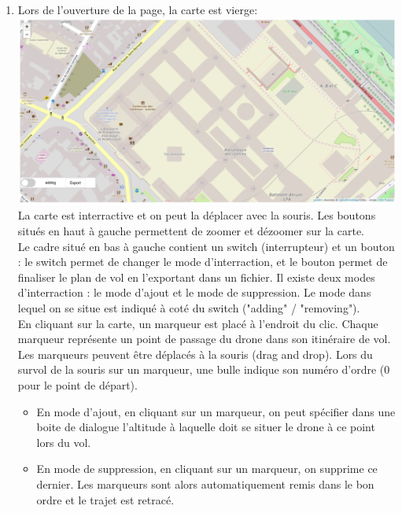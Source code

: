\documentclass{article}
\begin{document}
 \begin{enumerate}
 \item Lors de l'ouverture de la page, la carte est vierge:\\
 \includegraphics[scale=0.42]{capt1.PNG}\\
 La carte est interractive et on peut la déplacer avec la souris.
  Les boutons situés en haut à gauche permettent de zoomer et dézoomer sur la carte.\\
 Le cadre situé en bas à gauche contient un switch (interrupteur) et un bouton : le switch permet de changer le mode d'interraction, et le bouton permet de finaliser le plan de vol en l'exportant dans un fichier.
 Il existe deux modes d'interraction :  le mode d'ajout et le mode de suppression. Le mode dans lequel on se situe est indiqué à coté du switch ("adding" / "removing").\\
  En cliquant sur la carte, un marqueur est placé à l'endroit du clic. Chaque marqueur représente un point de passage du drone dans son itinéraire de vol. Les marqueurs peuvent être déplacés à la souris (drag and drop). Lors du survol de la souris sur un marqueur, une bulle indique son numéro d'ordre (0 pour le point de départ).
  \begin{itemize}
 \item En mode d'ajout, en cliquant sur un marqueur, on peut spécifier dans une boite de dialogue l'altitude à laquelle doit se situer le drone à ce point lors du vol.
 \item En mode de suppression, en cliquant sur un marqueur, on supprime ce dernier. Les marqueurs sont alors automatiquement remis dans le bon ordre et le trajet est retracé.
 \end{itemize}
    \medbreak
   

\end{enumerate}
\end{document}
